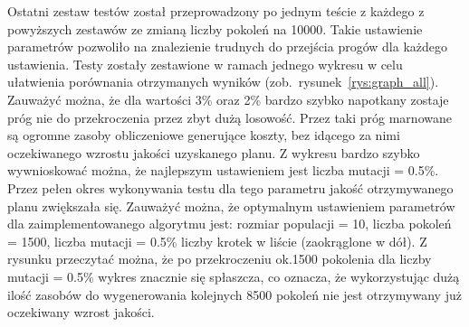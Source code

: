 	Ostatni zestaw testów został przeprowadzony po jednym teście z każdego z powyższych zestawów ze zmianą liczby pokoleń na 10000. Takie ustawienie parametrów pozwoliło na znalezienie trudnych do przejścia progów dla każdego ustawienia. Testy zostały zestawione w ramach jednego wykresu w celu ułatwienia porównania otrzymanych wyników (zob.~rysunek~\ref{rys:graph_all}). Zauważyć można, że dla wartości 3\% oraz 2\% bardzo szybko napotkany zostaje próg nie do przekroczenia przez zbyt dużą losowość. Przez taki próg marnowane są ogromne zasoby obliczeniowe generujące koszty, bez idącego za nimi oczekiwanego wzrostu jakości uzyskanego planu. Z wykresu bardzo szybko wywnioskować można, że najlepszym ustawieniem jest liczba mutacji = 0.5\%. Przez pełen okres wykonywania testu dla tego parametru jakość otrzymywanego planu zwiększała się. Zauważyć można, że optymalnym ustawieniem parametrów dla zaimplementowanego algorytmu jest: rozmiar populacji = 10, liczba pokoleń = 1500, liczba mutacji = 0.5\% liczby krotek w liście (zaokrąglone w dół). Z rysunku przeczytać można, że po przekroczeniu ok.1500 pokolenia dla liczby mutacji = 0.5\% wykres znacznie się spłaszcza, co oznacza, że wykorzystując dużą ilość zasobów do wygenerowania kolejnych 8500 pokoleń nie jest otrzymywany już oczekiwany wzrost jakości.

